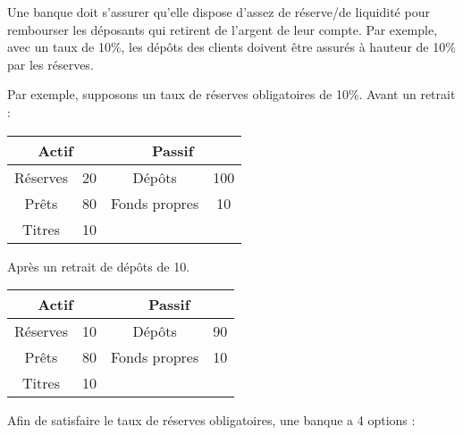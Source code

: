 	Une banque doit s'assurer qu'elle dispose d'assez de réserve/de liquidité pour rembourser les déposants qui retirent de l'argent de leur compte. Par exemple, avec un taux de 10\%, les dépôts des clients doivent être assurés à hauteur de 10\% par les réserves.
	
	Par exemple, supposons un taux de réserves obligatoires de 10\%. Avant un retrait :
	
\begin{center}
	\begin{tabular}{|c|c|c|c|}
	\hline 
	\multicolumn{2}{|c|}{Actif} & \multicolumn{2}{|c|}{Passif} \\ 
	\hline 
	Réserves & 20 & Dépôts & 100 \\ 
	\hline 
	Prêts & 80 & Fonds propres & 10 \\ 
	\hline 
	Titres & 10 &  &  \\ 
	\hline 
	\end{tabular} 
\end{center}
	
	Après un retrait de dépôts de 10.
	
\begin{center}
		\begin{tabular}{|c|c|c|c|}
	\hline 
	\multicolumn{2}{|c|}{Actif} & \multicolumn{2}{|c|}{Passif} \\ 
	\hline 
	Réserves & 10 & Dépôts & 90 \\ 
	\hline 
	Prêts & 80 & Fonds propres & 10 \\ 
	\hline 
	Titres & 10 &  &  \\ 
	\hline 
	\end{tabular}
	\end{center}	
	
	Afin de satisfaire le taux de réserves obligatoires, une banque a 4 options :
	
